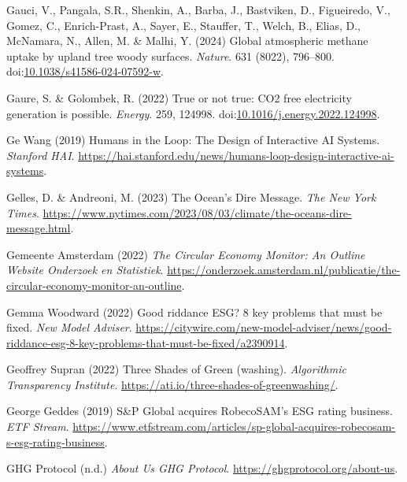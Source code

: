 \documentclass[
  letterpaper,
  DIV=11,
  numbers=noendperiod]{scrartcl}
\newlength{\cslhangindent}
\newenvironment{CSLReferences}[2] %
 {\begin{list}{}{%
  \setlength{\itemindent}{0pt}
  \setlength{\leftmargin}{0pt}
  \setlength{\parsep}{0pt}
  \ifodd #1
   \setlength{\leftmargin}{\cslhangindent}
   \setlength{\itemindent}{-1\cslhangindent}
  \fi
  \setlength{\itemsep}{#2\baselineskip}}}
 {\end{list}}
\begin{document}
\begin{CSLReferences}{0}{1}
Gauci, V., Pangala, S.R., Shenkin, A., Barba, J., Bastviken, D.,
Figueiredo, V., Gomez, C., Enrich-Prast, A., Sayer, E., Stauffer, T.,
Welch, B., Elias, D., McNamara, N., Allen, M. \& Malhi, Y. (2024) Global
atmospheric methane uptake by upland tree woody surfaces. \emph{Nature}.
631 (8022), 796--800.
doi:\href{https://doi.org/10.1038/s41586-024-07592-w}{10.1038/s41586-024-07592-w}.

Gaure, S. \& Golombek, R. (2022) True or not true: {CO2} free
electricity generation is possible. \emph{Energy}. 259, 124998.
doi:\href{https://doi.org/10.1016/j.energy.2022.124998}{10.1016/j.energy.2022.124998}.

Ge Wang (2019) Humans in the {Loop}: {The Design} of {Interactive AI
Systems}. \emph{Stanford HAI}.
\url{https://hai.stanford.edu/news/humans-loop-design-interactive-ai-systems}.

Gelles, D. \& Andreoni, M. (2023) The {Ocean}'s {Dire Message}.
\emph{The New York Times}.
\url{https://www.nytimes.com/2023/08/03/climate/the-oceans-dire-message.html}.

Gemeente Amsterdam (2022) \emph{{The Circular Economy Monitor: An
Outline {\textbar} Website Onderzoek en Statistiek}}.
\url{https://onderzoek.amsterdam.nl/publicatie/the-circular-economy-monitor-an-outline}.

Gemma Woodward (2022) Good riddance {ESG}? 8 key problems that must be
fixed. \emph{New Model Adviser}.
\url{https://citywire.com/new-model-adviser/news/good-riddance-esg-8-key-problems-that-must-be-fixed/a2390914}.

Geoffrey Supran (2022) Three {Shades} of {Green} (washing).
\emph{Algorithmic Transparency Institute}.
\url{https://ati.io/three-shades-of-greenwashing/}.

George Geddes (2019) S\&{P Global} acquires {RobecoSAM}'s {ESG} rating
business. \emph{ETF Stream}.
\url{https://www.etfstream.com/articles/sp-global-acquires-robecosam-s-esg-rating-business}.

GHG Protocol (n.d.) \emph{About {Us} {\textbar} {GHG Protocol}}.
\url{https://ghgprotocol.org/about-us}.


\end{CSLReferences}
\end{document}
